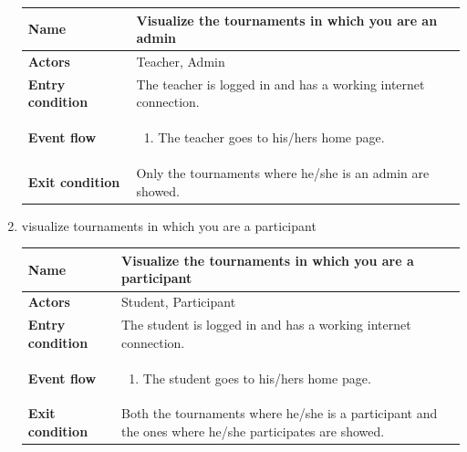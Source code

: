 \documentclass{article}
\begin{document}
\begin{enumerate}[label=\textbf{UC\arabic*}:]
      \begin{center}
        \begin{tabular}{ | m{8em} | m{10cm}|  } 
            \hline 
            \textbf{Name} & Visualize the tournaments in which you are an admin\\[1ex] 
            \hline 
            \textbf{Actors} & Teacher, Admin\\[1ex] 
            \hline 
            \textbf{Entry condition} & The teacher is logged in and has a working internet connection. \\[1ex] 
            \hline 
            \textbf{Event flow} & \begin{enumerate}[label=\textbf{\arabic*}:]
                \item The teacher goes to his/hers home page.
            \end{enumerate} \\[1ex]
            \hline 
            \textbf{Exit condition} & Only the tournaments where he/she is an admin are showed.\\[1ex]
        \end{tabular}
    \end{center}


        
        \item visualize tournaments in which you are a participant
            \begin{center}
            \begin{tabular}{ | m{8em} | m{10cm}|  } 
                \hline 
                \textbf{Name} & Visualize the tournaments in which you are a participant\\[1ex] 
                \hline 
                \textbf{Actors} & Student, Participant\\[1ex] 
                \hline 
                \textbf{Entry condition} & The student is logged in and has a working internet connection. \\[1ex] 
                \hline 
                \textbf{Event flow} & \begin{enumerate}[label=\textbf{\arabic*}:]
                    \item The student goes to his/hers home page.
                \end{enumerate} \\[1ex]
                \hline 
                \textbf{Exit condition} & Both the tournaments where he/she is a participant and the ones where he/she participates are showed.\\[1ex]
            \end{tabular}
            \end{center}





\end{enumerate}
\end{document}
